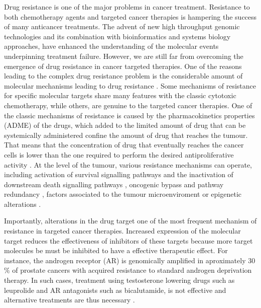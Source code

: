 \documentclass[12pt, b5paper,twoside]{tesi_upf}
\begin{document}
\par Drug resistance is one of the major problems in cancer treatment. Resistance to both chemotherapy agents and targeted cancer therapies is hampering the success of many anticancer treatments. The advent of new high throughput genomic technologies and its combination with bioinformatics and systems biology approaches, have enhanced the understanding of the molecular events underpinning treatment failure. However, we are still far from overcoming the emergence of drug resistance in cancer targeted therapies. One of the reasons leading to the complex drug resistance problem is the considerable amount of molecular mechanisms leading to drug resistance \cite{Holohan2013}. Some mechanisms of resistance for specific molecular targets share many features with the classic cytotoxic chemotherapy, while others, are genuine to the targeted cancer therapies. One of the classic mechanisms of resistance is caused by the pharmacokinetics properties (ADME) of the drugs, which added to the limited amount of drug that can be systemically administered confine the amount of drug that reaches the tumour. That means that the concentration of drug that eventually reaches the cancer cells is lower than the one required to perform the desired antiproliferative activity \cite{Gottesman2002}. At the level of the tumour, various resistance mechanisms can operate, including activation of survival signalling pathways and the inactivation of downstream death signalling pathways \cite{Lowe2004}, oncogenic bypass and pathway redundancy \cite{Logue2012}, factors associated to the tumour microenviroment \cite{McMillin2013} or epigenetic alterations \cite{Maier2005}.
\par Importantly, alterations in the drug target one of the most frequent mechanism of resistance in targeted cancer therapies. Increased expression of the molecular target reduces the effectiveness of inhibitors of these targets because more target molecules be must be inhibited to have a effective therapeutic effect. For instance, the androgen receptor (AR) is genomically amplified in aproximately 30$\%$ of prostate cancers with acquired resistance to standard androgen deprivation therapy. In such cases, treatment using testosterone lowering drugs such as leuprolide and AR antagonists such as bicalutamide, is not effective and alternative treatments are thus necessary \cite{Koivisto1997}. 
\end{document}
